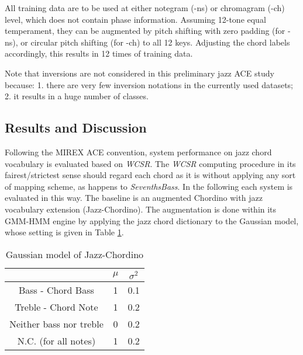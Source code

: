 
All training data are to be used at either notegram (-ns) or chromagram (-ch) level, which does not contain phase information. Assuming 12-tone equal temperament, they can be augmented by pitch shifting with zero padding (for -ns), or circular pitch shifting (for -ch) to all 12 keys. Adjusting the chord labels accordingly, this results in 12 times of training data.

Note that inversions are not considered in this preliminary jazz ACE study because: 1. there are very few inversion notations in the currently used datasets; 2. it results in a huge number of classes.

\subsection{Results and Discussion}
Following the MIREX ACE convention, system performance on jazz chord vocabulary is evaluated based on \textit{WCSR}. The \textit{WCSR} computing procedure in its fairest/strictest sense should regard each chord as it is without applying any sort of mapping scheme, as happens to \textit{SeventhsBass}. In the following each system is evaluated in this way. The baseline is an augmented Chordino with jazz vocabulary extension (Jazz-Chordino). The augmentation is done within its GMM-HMM engine by applying the jazz chord dictionary to the Gaussian model, whose setting is given in Table \ref{tab:5-jcgau}.
\begin{table}[h]
\centering
\footnotesize
\begin{tabular}{|c|c|c|} \hline
      & $\mu$ & $\sigma^2$ \\ \hline
Bass - Chord Bass & 1 & 0.1 \\ \hline
Treble - Chord Note & 1 & 0.2  \\ \hline
Neither bass nor treble & 0 & 0.2 \\ \hline
N.C. (for all notes)  & 1 & 0.2  \\ \hline
\end{tabular}
\caption{Gaussian model of Jazz-Chordino}
\label{tab:5-jcgau}
\end{table}

